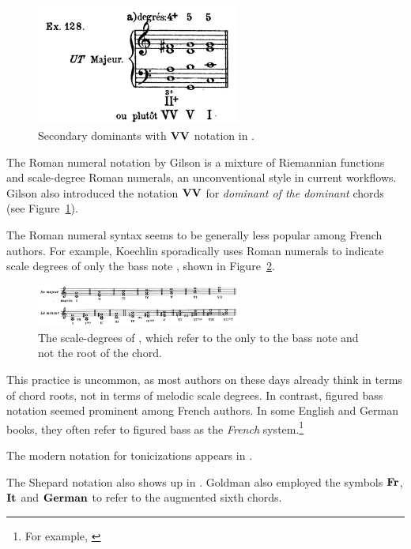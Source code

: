 \begin{figure}[h!]
    \centering
    \includegraphics[width=0.6\textwidth]{figures/chapter/2/primary_sources/gilson1919traite090.png}
    \caption{Secondary dominants with $\textbf{VV}\relax\relax$ notation in \textcite{gilson1919traite}.}
    \label{fig:gilson1919traite090}
\end{figure}

The Roman numeral notation by Gilson is a mixture of Riemannian functions and scale-degree Roman numerals, an unconventional style in current workflows.
Gilson also introduced the notation $\textbf{VV}\relax\relax$ for \emph{dominant of the dominant} chords (see Figure~\ref{fig:gilson1919traite090}).

The Roman numeral syntax seems to be generally less popular among French authors.
For example, Koechlin sporadically uses Roman numerals to indicate scale degrees of only the bass note \textcite{koechlin1928traite}, shown in Figure~\ref{fig:koechlin1928traite026}.

\begin{figure}[h!]
    \centering
    \includegraphics[width=0.6\textwidth]{figures/chapter/2/primary_sources/koechlin1928traite026.png}
    \caption{The scale-degrees of \textcite{koechlin1928traite}, which refer to the only to the bass note and not the root of the chord.}
    \label{fig:koechlin1928traite026}
\end{figure}

This practice is uncommon, as most authors on these days already think in terms of chord roots, not in terms of melodic scale degrees.
In contrast, figured bass notation seemed prominent among French authors.
In some English and German books, they often refer to figured bass as the \emph{French} system.\footnote{For example, \textcite{norris1894practical}}

The modern notation for tonicizations appears in \textcite{tischler1964practical}.

The Shepard notation also shows up in \textcite{goldman1965harmony}.
Goldman also employed the symbols $\textbf{Fr}\relax\relax$, $\textbf{It}\relax\relax$ and $\textbf{German}\relax\relax$ to refer to the augmented sixth chords.